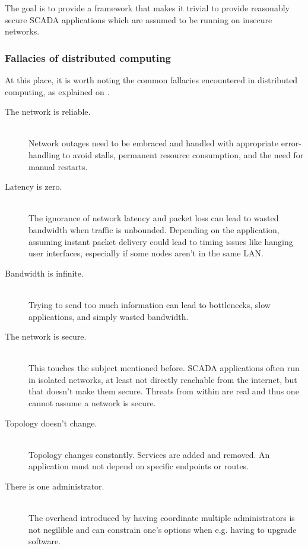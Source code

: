 The goal is to provide a framework that makes it trivial to provide reasonably
secure SCADA applications which are assumed to be running on insecure networks.

\subsubsection{Fallacies of distributed computing}
At this place, it is worth noting the common fallacies encountered in
distributed computing, as explained on \cite{dcomp:fallacies}.

\begin{description}
	\item [The network is reliable.] \hfill\\
		Network outages need to be embraced and handled with
		appropriate error-handling to avoid stalls, permanent
		resource consumption, and the need for manual restarts.

	\item [Latency is zero.] \hfill\\
		The ignorance of network latency and packet loss can lead to
		wasted bandwidth when traffic is unbounded. Depending on the
		application, assuming instant packet delivery could lead to
		timing issues like hanging user interfaces, especially if some
		nodes aren't in the same LAN.

	\item [Bandwidth is infinite.] \hfill\\
		Trying to send too much information can lead to bottlenecks,
		slow applications, and simply wasted bandwidth.

	\item [The network is secure.] \hfill\\
		This touches the subject mentioned before. SCADA applications
		often run in isolated networks, at least not directly reachable
		from the internet, but that doesn't make them secure. Threats
		from within are real and thus one cannot assume a network is
		secure.

	\item [Topology doesn't change.] \hfill\\
		Topology changes constantly. Services are added and removed. An
		application must not depend on specific endpoints or routes.

	\item [There is one administrator.] \hfill\\
		The overhead introduced by having coordinate multiple
		administrators is not negilible and can constrain one's options
		when e.g. having to upgrade software.


\end{description}

